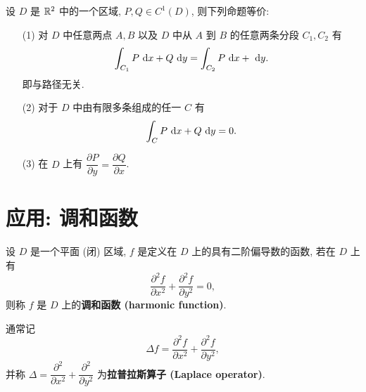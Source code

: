\begin{theorem}
	设 $D$ 是 $\mathbb R^2$ 中的一个区域, $P,Q\in C^1(D)$, 则下列命题等价:
	\begin{itemize}[leftmargin=1.5cm]
		\item[(1)] 对 $D$ 中任意两点 $A,B$ 以及 $D$ 中从 $A$ 到 $B$ 的任意两条分段 $C_1,C_2$ 有 $$\int_{C_1} P\ \text {d} x+Q\ \text {d} y = \int_{C_2}P\ \text {d} x+\ \text {d} y.$$
		即与路径无关.
		\item[(2)] 对于 $D$ 中由有限多条组成的任一 $C$ 有 $$\int_C P\ \text {d} x+Q\ \text {d} y = 0.$$
		\item[(3)] 在 $D$ 上有 $\dfrac{\partial P}{\partial y} = \dfrac{\partial Q}{\partial x}$.
	\end{itemize}
\end{theorem}

\section{应用: 调和函数}

\begin{definition}\label{调和函数}\label{拉普拉斯算子}
	设 $D$ 是一个平面 (闭) 区域, $f$ 是定义在 $D$ 上的具有二阶偏导数的函数, 若在 $D$ 上有 $$\frac{\partial^2 f}{\partial x^2}+\frac{\partial^2 f}{\partial y^2} = 0,$$
	则称 $f$ 是 $D$ 上的\textbf{调和函数 (harmonic function)}.

	通常记 $$\Delta f = \frac{\partial^2 f}{\partial x^2}+\frac{\partial^2 f}{\partial y^2},$$ 并称 $\Delta = \dfrac{\partial^2}{\partial x^2}+\dfrac{\partial^2}{\partial y^2}$ 为\textbf{拉普拉斯算子 (Laplace operator)}.
\end{definition}

